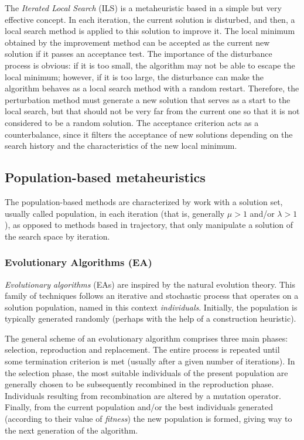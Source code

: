 The \emph{Iterated Local Search} (ILS)
\cite{loureco02iterated,stutzle99ILS} is a metaheuristic based in a simple but very effective concept. In each iteration, the current solution is disturbed, and then, a local search method is applied to this solution to improve it. The local minimum obtained by the improvement method can be accepted as the current new solution if it passes an acceptance test. The importance of the disturbance process is obvious: if it is too small, the algorithm may not be able to escape the local minimum; however, if it is too large, the disturbance can make the algorithm behaves as a local search method with a random restart. Therefore, the perturbation method must generate a new solution that serves as a start to the local search, but that should not be very far from the current one so that it is not considered to be a random solution. The acceptance criterion acts as a counterbalance, since it filters the acceptance of new solutions depending on the search history and the characteristics of the new local minimum.

\subsection{Population-based metaheuristics}\label{sec:PopulationBasedMetaheuristics}

The population-based methods are characterized by work with a solution set, usually called population, in each iteration (that is, generally $\mu > 1$ and/or $\lambda > 1$), as opposed to methods based in trajectory, that only manipulate a solution of the search space by iteration.

\subsubsection{Evolutionary Algorithms (EA)}\label{sec:EAs}

\emph{Evolutionary algorithms} (EAs) are inspired by the natural evolution theory. This family of techniques follows an iterative and stochastic process that operates on a solution population, named in this context \emph{individuals}. Initially, the population is typically generated randomly (perhaps with the help of a construction heuristic).

The general scheme of an evolutionary algorithm comprises three main phases: selection, reproduction and replacement. The entire process is repeated until some termination criterion is met (usually after a given number of iterations). In the selection phase, the most suitable individuals of the present population are generally chosen to be subsequently recombined in the reproduction phase. Individuals resulting from recombination are altered by a mutation operator. Finally, from the current population and/or the best individuals generated (according to their value of \emph{fitness}) the new population is formed, giving way to the next generation of the algorithm.

